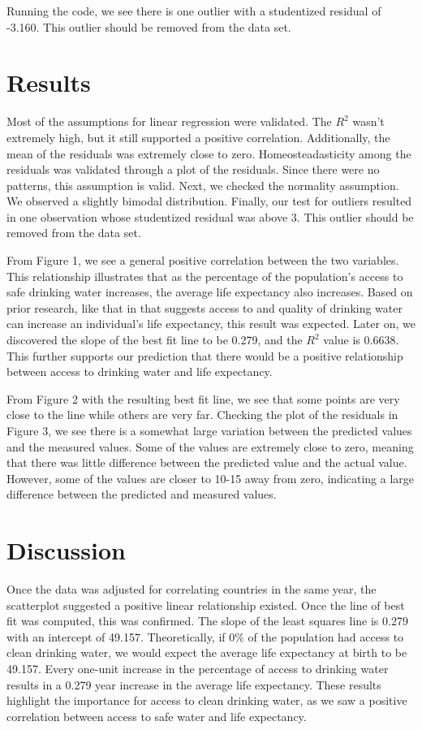 \documentclass[12pt]{article}
\begin{document}
Running the code, we see there is one outlier with a studentized residual of -3.160. This outlier should be removed from the data set.

\section{Results}

Most of the assumptions for linear regression were validated. The $R^2$ wasn't extremely high, but it still supported a positive correlation. Additionally, the mean of the residuals was extremely close to zero. Homeosteadasticity among the residuals was validated through a plot of the residuals. Since there were no patterns, this assumption is valid. Next, we checked the normality assumption. We observed a slightly bimodal distribution. Finally, our test for outliers resulted in one observation whose studentized residual was above 3. This outlier should be removed from the data set.

From Figure 1, we see a general positive correlation between the two variables. This relationship illustrates that as the percentage of the population's access to safe drinking water increases, the average life expectancy also increases. Based on prior research, like that in \citet{angelakis2021quality} that suggests access to and quality of drinking water can increase an individual's life expectancy, this result was expected. Later on, we discovered the slope of the best fit line to be 0.279, and the $R^2$ value is 0.6638. This further supports our prediction that there would be a positive relationship between access to drinking water and life expectancy.

From Figure 2 with the resulting best fit line, we see that some points are very close to the line while others are very far. Checking the plot of the residuals in Figure 3, we see there is a somewhat large variation between the predicted values and the measured values. Some of the values are extremely close to zero, meaning that there was little difference between the predicted value and the actual value. However, some of the values are closer to 10-15 away from zero, indicating a large difference between the predicted and measured values.

\section{Discussion}

Once the data was adjusted for correlating countries in the same year, the scatterplot suggested a positive linear relationship existed. Once the line of best fit was computed, this was confirmed. The slope of the least squares line is 0.279 with an intercept of 49.157. Theoretically, if $0\%$ of the population had access to clean drinking water, we would expect the average life expectancy at birth to be 49.157. Every one-unit increase in the percentage of access to drinking water results in a 0.279 year increase in the average life expectancy. These results highlight the importance for access to clean drinking water, as we saw a positive correlation between access to safe water and life expectancy.
\end{document}
